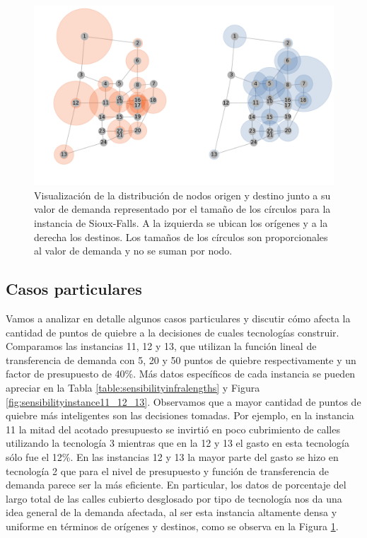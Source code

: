 \begin{figure}[h!]
  \centering
  \includegraphics[width=12cm]{../resources/sioux_falls_demand.png}
  \caption{Visualización de la distribución de nodos origen y destino junto a su valor de demanda representado por el tamaño de los círculos para la instancia de Sioux-Falls. A la izquierda se ubican los orígenes y a la derecha los destinos. Los tamaños de los círculos son proporcionales al valor de demanda y no se suman por nodo.}
  \label{fig:sioux_falls_demand}
\end{figure}

\clearpage
\subsection*{Casos particulares}

Vamos a analizar en detalle algunos casos particulares y discutir cómo afecta la cantidad de puntos de quiebre a la decisiones de cuales tecnologías construir. Comparamos las instancias 11, 12 y 13, que utilizan la función lineal de transferencia de demanda con 5, 20 y 50 puntos de quiebre respectivamente y un factor de presupuesto de 40\%. Más datos específicos de cada instancia se pueden apreciar en la Tabla \ref{table:sensibilityinfralengths} y Figura \ref{fig:sensibilityinstance11_12_13}. Observamos que a mayor cantidad de puntos de quiebre más inteligentes son las decisiones tomadas. Por ejemplo, en la instancia 11 la mitad del acotado presupuesto se invirtió en poco cubrimiento de calles utilizando la tecnología 3 mientras que en la 12 y 13 el gasto en esta tecnología sólo fue el 12\%. En las instancias 12 y 13 la mayor parte del gasto se hizo en tecnología 2 que para el nivel de presupuesto y función de transferencia de demanda parece ser la más eficiente. En particular, los datos de porcentaje del largo total de las calles cubierto desglosado por tipo de tecnología nos da una idea general de la demanda afectada, al ser esta instancia altamente densa y uniforme en términos de orígenes y destinos, como se observa en la Figura \ref{fig:sioux_falls_demand}.

